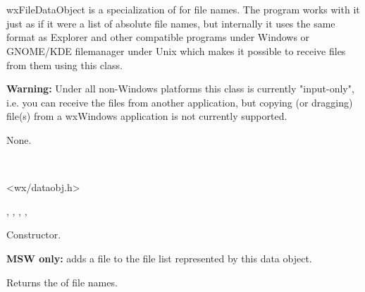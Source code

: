 \section{}\label{wxfiledataobject}

wxFileDataObject is a specialization of  
for file names. The program works with it just as if it were a list of absolute file
names, but internally it uses the same format as
Explorer and other compatible programs under Windows or GNOME/KDE filemanager
under Unix which makes it possible to receive files from them using this
class.

{\bf Warning:} Under all non-Windows platforms this class is currently
"input-only", i.e. you can receive the files from another application, but
copying (or dragging) file(s) from a wxWindows application is not currently
supported.


None.


\\


<wx/dataobj.h>


, 
, 
, 
, 


\label{wxfiledataobjectwxfiledataobject}


Constructor.

\label{wxfiledataobjectaddfile}


{\bf MSW only:} adds a file to the file list represented by this data object.

\label{wxfiledataobjectgetfilenames}


Returns the  of file names.

